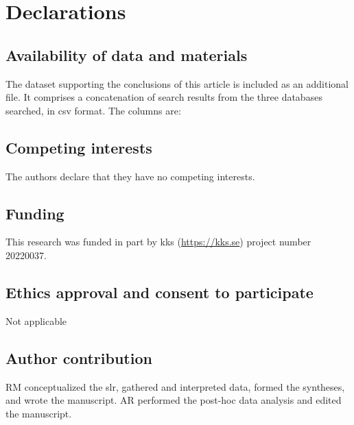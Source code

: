 \documentclass[referee,pdflatex,sn-mathphys-num]{sn-jnl}%
\begin{document}
\printglossaries



\backmatter




\section*{Declarations}

\subsection*{Availability of data and materials}
The dataset supporting the conclusions of this article is included as an additional file. It comprises a concatenation of search results from the three databases searched, in \gls{csv} format. The columns are:

\begin{table}[htbp]
  \centering
  \caption{Explanation of fields in accompanying file of database search results}
  
  \label{tab:search_results_csv}
\end{table}

\subsection*{Competing interests}
The authors declare that they have no competing interests.

\subsection*{Funding}
This research was funded in part by \gls{kks} (\href{https://kks.se}{https://kks.se}) project number 20220037.

\subsection*{Ethics approval and consent to participate}
Not applicable

\subsection*{Author contribution}
RM conceptualized the \gls{slr}, gathered and interpreted data, formed the syntheses, and wrote the manuscript. AR performed the post-hoc data analysis and edited the manuscript.
\end{document}
